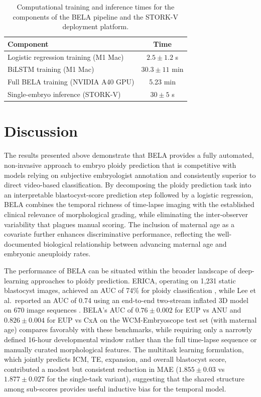 \documentclass[11pt]{article}
\begin{document}
\begin{table}[htbp]
\centering
\caption{Computational training and inference times for the components of the BELA pipeline and the STORK-V deployment platform.}
\label{tab:timing}
\begin{tabular}{lc}
\toprule
Component & Time \\
\midrule
Logistic regression training (M1 Mac) & $2.5 \pm 1.2$ s \\
BiLSTM training (M1 Mac) & $30.3 \pm 11$ min \\
Full BELA training (NVIDIA A40 GPU) & 5.23 min \\
Single-embryo inference (STORK-V) & $30 \pm 5$ s \\
\bottomrule
\end{tabular}
\end{table}


\section{Discussion}

The results presented above demonstrate that BELA provides a fully automated, non-invasive approach to embryo ploidy prediction that is competitive with models relying on subjective embryologist annotation and consistently superior to direct video-based classification. By decomposing the ploidy prediction task into an interpretable blastocyst-score prediction step followed by a logistic regression, BELA combines the temporal richness of time-lapse imaging with the established clinical relevance of morphological grading, while eliminating the inter-observer variability that plagues manual scoring. The inclusion of maternal age as a covariate further enhances discriminative performance, reflecting the well-documented biological relationship between advancing maternal age and embryonic aneuploidy rates.

The performance of BELA can be situated within the broader landscape of deep-learning approaches to ploidy prediction. ERICA, operating on 1{,}231 static blastocyst images, achieved an AUC of 74\% for ploidy classification \citep{chavezbadiola2020erica}, while Lee et al.\ reported an AUC of 0.74 using an end-to-end two-stream inflated 3D model on 670 image sequences \citep{lee2021endtoend}. BELA's AUC of $0.76 \pm 0.002$ for EUP vs ANU and $0.826 \pm 0.004$ for EUP vs CxA on the WCM-Embryoscope test set (with maternal age) compares favorably with these benchmarks, while requiring only a narrowly defined 16-hour developmental window rather than the full time-lapse sequence or manually curated morphological features. The multitask learning formulation, which jointly predicts ICM, TE, expansion, and overall blastocyst score, contributed a modest but consistent reduction in MAE ($1.855 \pm 0.03$ vs $1.877 \pm 0.027$ for the single-task variant), suggesting that the shared structure among sub-scores provides useful inductive bias for the temporal model.
\end{document}
